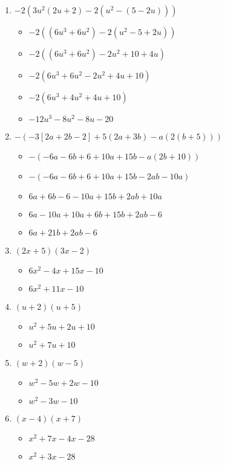 \documentclass{article}
\begin{document}
\begin{onehalfspace}
\begin{enumerate}
    \item $-2(3u^{2}(2u + 2) - 2(u^{2} - (5 - 2u)))$
    \begin{itemize}
        \item $-2((6u^{3} + 6u^{2}) - 2(u^{2} - 5 + 2u))$
        \item $-2((6u^{3} + 6u^{2}) - 2u^{2} + 10 + 4u)$
        \item $-2(6u^{3} + 6u^{2} - 2u^{2} + 4u + 10)$
        \item $-2(6u^{3} + 4u^{2} + 4u + 10)$
        \item $-12u^{3} - 8u^{2} - 8u - 20$
    \end{itemize}

    \item $-(-3[2a + 2b - 2] + 5(2a + 3b) - a(2(b + 5)))$
    \begin{itemize}
        \item $-(-6a - 6b + 6 + 10a + 15b - a(2b + 10))$
        \item $-(-6a - 6b + 6 + 10a + 15b - 2ab - 10a)$
        \item $6a + 6b - 6 - 10a + 15b + 2ab + 10a$
        \item $6a - 10a + 10a + 6b + 15b + 2ab - 6$
        \item $6a + 21b + 2ab - 6$
    \end{itemize}

    \item $(2x + 5)(3x - 2)$
    \begin{itemize}
        \item $6x^{2} - 4x + 15x - 10$
        \item $6x^{2} + 11x - 10$
    \end{itemize}

    \item $(u + 2)(u + 5)$
    \begin{itemize}
        \item $u^{2} + 5u + 2u + 10$
        \item $u^{2} + 7u + 10$
    \end{itemize}

    \item $(w + 2)(w - 5)$
    \begin{itemize}
        \item $w^{2} - 5w + 2w - 10$
        \item $w^{2} - 3w - 10$
    \end{itemize}

    \item $(x - 4)(x + 7)$
    \begin{itemize}
        \item $x^{2} + 7x - 4x - 28$
        \item $x^{2} + 3x - 28$
    \end{itemize}


\end{enumerate}
\end{onehalfspace}
\end{document}
